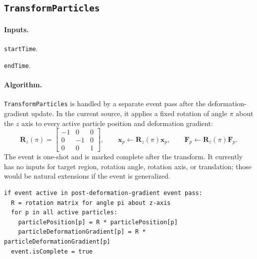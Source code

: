 \subsection{\texttt{TransformParticles}}
\label{subsec:event-transform-particles}

\paragraph{Inputs.}
\begin{description}[leftmargin=*,style=nextline]
\item[\textbf{Required.}] \texttt{startTime}.
\item[\textbf{Optional.}] \texttt{endTime}.
\end{description}

\paragraph{Algorithm.}
\texttt{TransformParticles} is handled by a separate event pass after the deformation-gradient update.  In the current source, it applies a fixed rotation of angle $\pi$ about the $z$ axis to every active particle position and deformation gradient:
\begin{equation}
  \mathbf{R}_z(\pi)=
  \begin{bmatrix}
  -1 & 0 & 0\\
   0 &-1 & 0\\
   0 & 0 & 1
  \end{bmatrix},
  \qquad
  \mathbf{x}_p\leftarrow\mathbf{R}_z(\pi)\mathbf{x}_p,
  \qquad
  \mathbf{F}_p\leftarrow\mathbf{R}_z(\pi)\mathbf{F}_p.
  \label{eq:transform-particles-rotation}
\end{equation}
The event is one-shot and is marked complete after the transform.  It currently has no inputs for target region, rotation angle, rotation axis, or translation; those would be natural extensions if the event is generalized.

\begin{lstlisting}[caption={TransformParticles event pseudocode.}]
if event active in post-deformation-gradient event pass:
  R = rotation matrix for angle pi about z-axis
  for p in all active particles:
    particlePosition[p] = R * particlePosition[p]
    particleDeformationGradient[p] = R * particleDeformationGradient[p]
  event.isComplete = true
\end{lstlisting}

